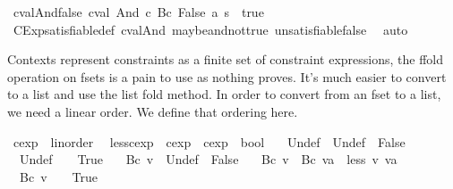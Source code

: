 \begin{isabellebody}
\ cval{\isacharunderscore}And{\isacharunderscore}false{\isacharcolon}\ {\isachardoublequoteopen}cval\ {\isacharparenleft}And\ c\ {\isacharparenleft}Bc\ False{\isacharparenright}{\isacharparenright}\ a\ s\ {\isasymnoteq}\ true{\isachardoublequoteclose}\isanewline
%
\isadelimproof
\ \ %
\endisadelimproof
%
\isatagproof
{}\isamarkupfalse%
\ CExp{\isachardot}satisfiable{\isacharunderscore}def\ cval{\isacharunderscore}And\ maybe{\isacharunderscore}and{\isacharunderscore}not{\isacharunderscore}true\ unsatisfiable{\isacharunderscore}false\ \isamarkupfalse%
\ auto%
\endisatagproof
{\isafoldproof}%
%
\isadelimproof
%
\endisadelimproof
%
\isadelimdocument
%
\endisadelimdocument
%
\isatagdocument
%
\isamarkuptrue%
%
\endisatagdocument
{\isafolddocument}%
%
\isadelimdocument
%
\endisadelimdocument
%
\begin{isamarkuptext}%
Contexts represent constraints as a finite set of constraint expressions, the ffold operation on
fsets is a pain to use as nothing proves. It's much easier to convert to a list and use the list
fold method. In order to convert from an fset to a list, we need a linear order. We define that
ordering here.%
\end{isamarkuptext}\isamarkuptrue%
\isamarkupfalse%
\ cexp\ {\isacharcolon}{\isacharcolon}\ linorder\ \isanewline
{}\isamarkupfalse%
\ less{\isacharunderscore}cexp\ {\isacharcolon}{\isacharcolon}\ {\isachardoublequoteopen}cexp\ {\isasymRightarrow}\ cexp\ {\isasymRightarrow}\ bool{\isachardoublequoteclose}\ \isanewline
\ \ {\isachardoublequoteopen}{\isacharparenleft}Undef\ {\isacharless}\ Undef{\isacharparenright}\ {\isacharequal}\ False{\isachardoublequoteclose}\ {\isacharbar}\isanewline
\ \ {\isachardoublequoteopen}{\isacharparenleft}Undef\ {\isacharless}\ {\isacharunderscore}{\isacharparenright}\ {\isacharequal}\ True{\isachardoublequoteclose}\ {\isacharbar}\isanewline
\isanewline
\ \ {\isachardoublequoteopen}{\isacharparenleft}Bc\ v\ {\isacharless}\ Undef{\isacharparenright}\ {\isacharequal}\ False{\isachardoublequoteclose}\ {\isacharbar}\isanewline
\ \ {\isachardoublequoteopen}{\isacharparenleft}Bc\ v\ {\isacharless}\ Bc\ va{\isacharparenright}\ {\isacharequal}\ less\ v\ va{\isachardoublequoteclose}\ {\isacharbar}\isanewline
\ \ {\isachardoublequoteopen}{\isacharparenleft}Bc\ v\ {\isacharless}\ {\isacharunderscore}{\isacharparenright}\ {\isacharequal}\ True{\isachardoublequoteclose}\ {\isacharbar}\isanewline

\end{isabellebody}

